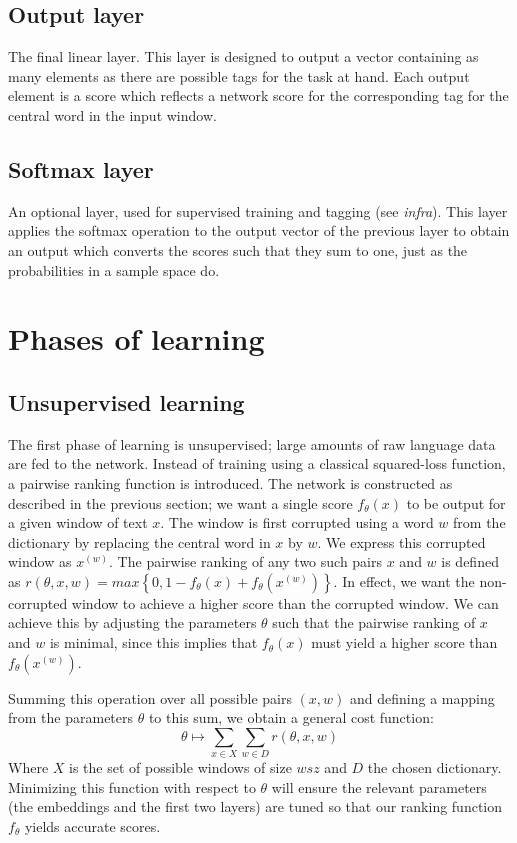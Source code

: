 \subsection{Output layer}

The final linear layer. This layer is designed to output a vector
containing as many elements as there are possible tags for the task at
hand.  Each output element is a score which reflects a network score
for the corresponding tag for the central word in the input window.

\subsection{Softmax layer}

An optional layer, used for supervised training and tagging (see
\textit{infra}). This layer applies the softmax operation
\citep{bridle1990probabilistic} to the output vector of the previous
layer to obtain an output which converts the scores such that they sum
to one, just as the probabilities in a sample space do.


\section{Phases of learning}
\subsection{Unsupervised learning}
\label{sec:unsupervised}

The first phase of learning is unsupervised; large amounts of raw
language data are fed to the network. Instead of training using a
classical squared-loss function, a pairwise ranking function is
introduced. The network is constructed as described in the previous
section; we want a single score $f_{\theta}(x)$ to be output for a
given window of text $x$.  The window is first corrupted using a word
$w$ from the dictionary by replacing the central word in $x$ by
$w$. We express this corrupted window as $x^{(w)}$. The pairwise
ranking of any two such pairs $x$ and $w$ is defined as $r(\theta, x, w) = max\left\{0,
  1 - f_{\theta}(x) + f_{\theta}(x^{(w)})\right\}$. 
In effect, we want the non-corrupted window to achieve a higher score
than the corrupted window. We can achieve this by adjusting the
parameters $\theta$ such that the pairwise ranking of $x$ and $w$ is
minimal, since this implies that $f_{\theta}(x)$ must yield a higher
score than $f_{\theta}(x^{(w)})$.

Summing this operation over all possible pairs $(x, w)$ and defining a
mapping from the parameters $\theta$ to this sum, we obtain a general
cost function:
\begin{equation}
  \theta \mapsto \sum\limits_{x \in X} \sum\limits_{w \in D} r(\theta, x, w)
\end{equation}
Where $X$ is the set of possible windows of size $wsz$ and $D$ the chosen
dictionary. Minimizing this function with respect to $\theta$ will
ensure the relevant parameters (the embeddings and the first two
layers) are tuned so that our ranking function $f_{\theta}$ yields
accurate scores. 

